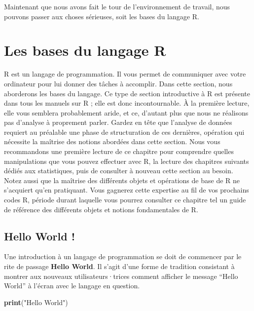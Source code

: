 \documentclass[
  11pt,
  french,
]{book}
\makeatletter
\newenvironment{Shaded}{\begin{snugshade}}{\end{snugshade}}
\newcommand{\KeywordTok}[1]{\textcolor[rgb]{0.13,0.29,0.53}{\textbf{#1}}}
\newcommand{\NormalTok}[1]{#1}
\newcommand{\StringTok}[1]{\textcolor[rgb]{0.31,0.60,0.02}{#1}}
\newenvironment{kframe}{%
\medskip{}
\setlength{\fboxsep}{.8em}
 \def\at@end@of@kframe{}%
 \ifinner\ifhmode%
  \def\at@end@of@kframe{\end{minipage}}%
  \begin{minipage}{\columnwidth}%
 \fi\fi%
 \def\FrameCommand##1{\hskip\@totalleftmargin \hskip-\fboxsep
 \colorbox{shadecolor}{##1}\hskip-\fboxsep
     \hskip-\linewidth \hskip-\@totalleftmargin \hskip\columnwidth}%
 \MakeFramed {\advance\hsize-\width
   \@totalleftmargin\z@ \linewidth\hsize
   \@setminipage}}%
 {\par\unskip\endMakeFramed%
 \at@end@of@kframe}
\renewenvironment{Shaded}{\begin{kframe}}{\end{kframe}}
\makeatother
\begin{document}
Maintenant que nous avons fait le tour de l'environnement de travail, nous pouvons passer aux choses sérieuses, soit les bases du langage R.

\hypertarget{sect013}{%
\section{Les bases du langage R}\label{sect013}}

R est un langage de programmation. Il vous permet de communiquer avec votre ordinateur pour lui donner des tâches à accomplir. Dans cette section, nous aborderons les bases du langage. Ce type de section introductive à R est présente dans tous les manuels sur R ; elle est donc incontournable. À la première lecture, elle vous semblera probablement aride, et ce, d'autant plus que nous ne réalisons pas d'analyse à proprement parler. Gardez en tête que l'analyse de données requiert au préalable une phase de structuration de ces dernières, opération qui nécessite la maîtrise des notions abordées dans cette section. Nous vous recommandons une première lecture de ce chapitre pour comprendre quelles manipulations que vous pouvez effectuer avec R, la lecture des chapitres suivants dédiés aux statistiques, puis de consulter à nouveau cette section au besoin. Notez aussi que la maîtrise des différents objets et opérations de base de R ne s'acquiert qu'en pratiquant. Vous gagnerez cette expertise au fil de vos prochains codes R, période durant laquelle vous pourrez consulter ce chapitre tel un guide de référence des différents objets et notions fondamentales de R.

\hypertarget{sect0131}{%
\subsection{Hello World !}\label{sect0131}}

Une introduction à un langage de programmation se doit de commencer par le rite de passage \textbf{Hello World}. Il s'agit d'une forme de tradition consistant à montrer aux nouveaux utilisateurs·trices comment afficher le message ``Hello World'' à l'écran avec le langage en question.

\begin{Shaded}
\begin{Highlighting}[]
\KeywordTok{print}\NormalTok{(}\StringTok{"Hello World"}\NormalTok{)}
\end{Highlighting}
\end{Shaded}
\end{document}
